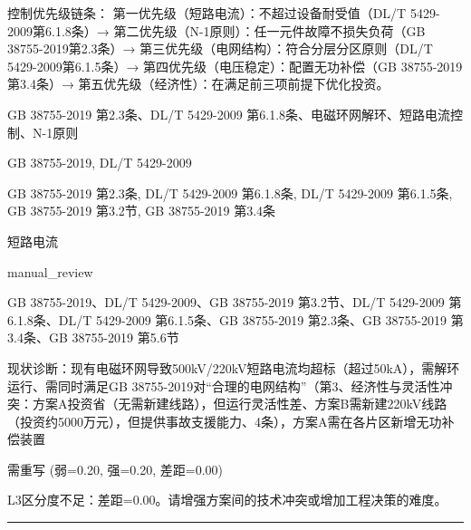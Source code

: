 \documentclass[11pt,a4paper]{ctexart}
\begin{document}
\begin{description}[leftmargin=1.5em,style=nextline,font=\normalfont]
控制优先级链条：
第一优先级（短路电流）：不超过设备耐受值（DL/T 5429-2009第6.1.8条）→ 第二优先级（N-1原则）：任一元件故障不损失负荷（GB 38755-2019第2.3条）→ 第三优先级（电网结构）：符合分层分区原则（DL/T 5429-2009第6.1.5条）→ 第四优先级（电压稳定）：配置无功补偿（GB 38755-2019第3.4条）→ 第五优先级（经济性）：在满足前三项前提下优化投资。
  \item[KW:] GB 38755-2019 第2.3条、DL/T 5429-2009 第6.1.8条、电磁环网解环、短路电流控制、N-1原则
  \item[标准:] GB 38755-2019, DL/T 5429-2009
  \item[条款溯源:] GB 38755-2019 第2.3条, DL/T 5429-2009 第6.1.8条, DL/T 5429-2009 第6.1.5条, GB 38755-2019 第3.2节, GB 38755-2019 第3.4条
  \item[主题:] 短路电流
  \item[评分方式:] manual\_review
  \item[Rubric条款:] GB 38755-2019、DL/T 5429-2009、GB 38755-2019 第3.2节、DL/T 5429-2009 第6.1.8条、DL/T 5429-2009 第6.1.5条、GB 38755-2019 第2.3条、GB 38755-2019 第3.4条、GB 38755-2019 第5.6节
  \item[Rubric判据:] 现状诊断：现有电磁环网导致500kV/220kV短路电流均超标（超过50kA），需解环运行、需同时满足GB 38755-2019对“合理的电网结构”（第3、经济性与灵活性冲突：方案A投资省（无需新建线路），但运行灵活性差、方案B需新建220kV线路（投资约5000万元），但提供事故支援能力、4条），方案A需在各片区新增无功补偿装置
  \item[LJ判定:] 需重写 (弱=0.20, 强=0.20, 差距=0.00)
  \item[LJ反馈:] L3区分度不足：差距=0.00。请增强方案间的技术冲突或增加工程决策的难度。
\end{description}
\vspace{4pt}
\hrule
\vspace{6pt}
\end{document}
